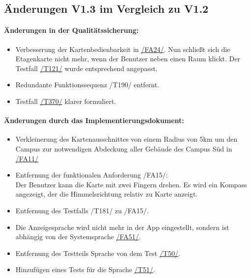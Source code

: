 \subsection*{Änderungen V1.3 im Vergleich zu V1.2}
\paragraph*{Änderungen in der Qualitätssicherung:}
\begin{itemize}
    \item Verbesserung der Kartenbedienbarkeit in \hyperref[/FA24/]{/FA24/}. Nun schließt sich die Etagenkarte nicht mehr, wenn der Benutzer neben einen Raum klickt. Der Testfall \hyperref[/T121/]{/T121/} wurde entsprechend angepasst.
    \item Redundante Funktionssequenz /T190/ entfernt.
    \item Testfall \hyperref[/T370/]{/T370/} klarer formuliert.
\end{itemize}

\paragraph*{Änderungen durch das Implementierungsdokument:}
\begin{itemize}
    \item Verkleinerung des Kartenausschnittes von einem Radius von 5km um den \Gls{Campus} zur notwendigen Abdeckung aller Gebäude des \Gls{Campus} Süd in \hyperref[/FA11/]{/FA11/}
    \item Entfernung der funktionalen Anforderung /FA15/: \\ Der \Gls{Benutzer} kann die \Gls{Karte} mit zwei Fingern drehen. Es wird ein Kompass angezeigt, der die Himmelsrichtung relativ zu \Gls{Karte} anzeigt.
    \item Entfernung des Testfalls /T181/ zu /FA15/.
    \item Die Anzeigesprache wird nicht mehr in der App eingestellt, sondern ist abhängig von der Systemsprache \hyperref[/FA51/]{/FA51/}.
    \item Entfernung des Testteils Sprache von dem Test \hyperref[/T50/]{/T50/}.
    \item Hinzufügen eines Tests für die Sprache \hyperref[/T51/]{/T51/}.
\end{itemize}